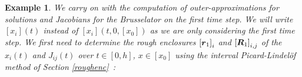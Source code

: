 \documentclass{sig-alternate-05-2015}
\newcommand\ForAuthors[1]%
 {\par\smallskip                     %
  \begin{center}%
   \fbox%
   {\parbox{0.9\linewidth}%
    {\raggedright\sc--- #1}%
   }%
  \end{center}%
  \par\smallskip                     %
 }
\newtheorem{example}{Example}
\def\intvl#1{\mbox{$[ #1 ]$}}
\begin{document}
\begin{example}
\label{running2}
We carry on with the computation of outer-approximations for solutions and Jacobians for 
the Brusselator on the first time
step.
We will write $\intvl{x_i}(t)$ instead of $\intvl{x_i}(t,0,\intvl{x_0})$ as
we are only considering the first time step. 
We first need to determine the rough enclosures
$\intvl{\r_1}_i$ and $\intvl{\bfm{R}_1}_{i,j}$ of the $x_i(t)$ and $J_{ij}(t)$ over $t\in [0,h]$, 
$x \in \intvl{x_0}$ %
using the interval Picard-Lindel\"of method of Section \ref{roughenc}~: 

\end{example}
\end{document}
